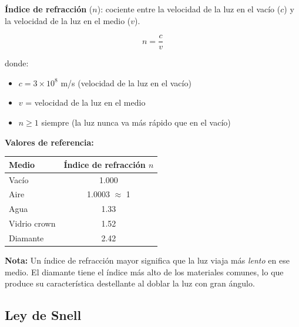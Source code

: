 \begin{seccion}
\begin{definicion}
\textbf{Índice de refracción} ($n$): cociente entre la velocidad de la luz en el vacío ($c$) y la velocidad de la luz en el medio ($v$).
\end{definicion}

\begin{ecuacion}
$$n = \frac{c}{v}$$

donde:
\begin{itemize}
    \item $c = 3 \times 10^8$ m/s (velocidad de la luz en el vacío)
    \item $v$ = velocidad de la luz en el medio
    \item $n \geq 1$ siempre (la luz nunca va más rápido que en el vacío)
\end{itemize}
\end{ecuacion}

\textbf{Valores de referencia:}

\begin{center}
\begin{tabular}{lc}
\hline
\rowcolor{fondogris}
\textbf{Medio}   & \textbf{Índice de refracción $n$} \\
\hline
Vacío            & 1.000 \\
Aire             & 1.0003 $\approx$ 1 \\
Agua             & 1.33 \\
Vidrio crown     & 1.52 \\
Diamante         & 2.42 \\
\hline
\end{tabular}
\end{center}

\begin{nota}
\textbf{Nota:} Un índice de refracción mayor significa que la luz viaja más \textit{lento} en ese medio. El diamante tiene el índice más alto de los materiales comunes, lo que produce su característica destellante al doblar la luz con gran ángulo.
\end{nota}
\end{seccion}

\subsection{Ley de Snell}


